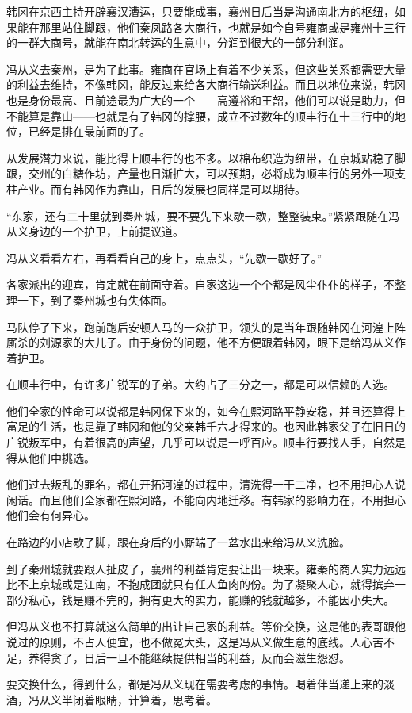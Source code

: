 韩冈在京西主持开辟襄汉漕运，只要能成事，襄州日后当是沟通南北方的枢纽，如果能在那里站住脚跟，他们秦凤路各大商行，也就是如今自号雍商或是雍州十三行的一群大商号，就能在南北转运的生意中，分润到很大的一部分利润。

冯从义去秦州，是为了此事。雍商在官场上有着不少关系，但这些关系都需要大量的利益去维持，不像韩冈，能反过来给各大商行输送利益。而且以地位来说，韩冈也是身份最高、且前途最为广大的一个——高遵裕和王韶，他们可以说是助力，但不能算是靠山——也就是有了韩冈的撑腰，成立不过数年的顺丰行在十三行中的地位，已经是排在最前面的了。

从发展潜力来说，能比得上顺丰行的也不多。以棉布织造为纽带，在京城站稳了脚跟，交州的白糖作坊，产量也日渐扩大，可以预期，必将成为顺丰行的另外一项支柱产业。而有韩冈作为靠山，日后的发展也同样是可以期待。

“东家，还有二十里就到秦州城，要不要先下来歇一歇，整整装束。”紧紧跟随在冯从义身边的一个护卫，上前提议道。

冯从义看看左右，再看看自己的身上，点点头，“先歇一歇好了。”

各家派出的迎宾，肯定就在前面守着。自家这边一个个都是风尘仆仆的样子，不整理一下，到了秦州城也有失体面。

马队停了下来，跑前跑后安顿人马的一众护卫，领头的是当年跟随韩冈在河湟上阵厮杀的刘源家的大儿子。由于身份的问题，他不方便跟着韩冈，眼下是给冯从义作着护卫。

在顺丰行中，有许多广锐军的子弟。大约占了三分之一，都是可以信赖的人选。

他们全家的性命可以说都是韩冈保下来的，如今在熙河路平静安稳，并且还算得上富足的生活，也是靠了韩冈和他的父亲韩千六才得来的。也因此韩家父子在旧日的广锐叛军中，有着很高的声望，几乎可以说是一呼百应。顺丰行要找人手，自然是得从他们中挑选。

他们过去叛乱的罪名，都在开拓河湟的过程中，清洗得一干二净，也不用担心人说闲话。而且他们全家都在熙河路，不能向内地迁移。有韩家的影响力在，不用担心他们会有何异心。

在路边的小店歇了脚，跟在身后的小厮端了一盆水出来给冯从义洗脸。

到了秦州城就要跟人扯皮了，襄州的利益肯定要让出一块来。雍秦的商人实力远远比不上京城或是江南，不抱成团就只有任人鱼肉的份。为了凝聚人心，就得摈弃一部分私心，钱是赚不完的，拥有更大的实力，能赚的钱就越多，不能因小失大。

但冯从义也不打算就这么简单的出让自己家的利益。等价交换，这是他的表哥跟他说过的原则，不占人便宜，也不做冤大头，这是冯从义做生意的底线。人心苦不足，养得贪了，日后一旦不能继续提供相当的利益，反而会滋生怨怼。

要交换什么，得到什么，都是冯从义现在需要考虑的事情。喝着伴当递上来的淡酒，冯从义半闭着眼睛，计算着，思考着。

